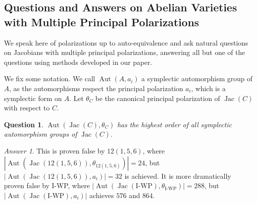 \documentclass[12pt,reqno]{amsart}
\DeclareMathOperator{\Aut}{Aut}
\DeclareMathOperator{\Jac}{Jac}
\newcommand{\C}{\mathbb{C}}
\renewcommand{\P}{\mathbb{P}}
\newtheorem*{question}{Question}
\theoremstyle{definition}
\theoremstyle{remark}
\newtheorem*{answer}{Answer}
\begin{document}


\subsection{Questions and Answers on Abelian Varieties with Multiple Principal Polarizations}
\label{sec:questions}

We speak here of polarizations up to auto-equivalence and ask natural questions on Jacobians with multiple principal polarizations, answering all but one of the questions using methods developed in our paper.

We fix some notation. We call $\Aut(A, a_i)$ a symplectic automorphism group of $A$, as the automorphisms respect the principal polarization $a_i$, which is a symplectic form on $A$. Let $\theta_C$ be the canonical principal polarization of $\Jac(C)$ with respect to $C$.

\begin{question} $\Aut(\Jac(C), \theta_C)$ has the highest order of all symplectic automorphism groups of $\Jac(C)$. \end{question}

\begin{answer} This is proven false by $12(1,5,6)$, where $|\Aut(\Jac(12(1, 5, 6)), \theta_{12(1, 5, 6)})| = 24$, but $|\Aut(\Jac(12(1, 5, 6)), a_i)| = 32$ is achieved. It is more dramatically proven false by I-WP, where $|\Aut(\Jac(\text{I-WP}), \theta_{\text{I-WP}})| = 288$, but $|\Aut(\Jac(\text{I-WP}), a_i)|$ achieves $576$ and $864$. \end{answer}
\end{document}
